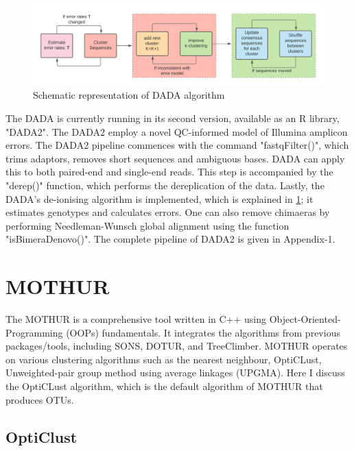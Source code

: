 \begin{figure}
  \centering
  \includegraphics[width=15cm]{../figures/Figure4.png}
  \caption{Schematic representation of DADA algorithm}
  \label{fig:figure4}
\end{figure}

The DADA is currently running in its second version, available as an R library, "DADA2". The DADA2 employ a novel QC-informed model of Illumina amplicon errors. The DADA2 pipeline commences with the command "fastqFilter()", which trims adaptors, removes short sequences and ambiguous bases. DADA can apply this to both paired-end and single-end reads. This step is accompanied by the "derep()" function, which performs the dereplication of the data. Lastly, the DADA's de-ionising algorithm is implemented, which is explained in  \ref{fig:figure4}; it estimates genotypes and calculates errors. One can also remove chimaeras by performing Needleman-Wunsch global alignment using the function "isBimeraDenovo()". The complete pipeline of DADA2 is given in Appendix-1.

\section{MOTHUR}
The MOTHUR is a comprehensive tool written in C++ using Object-Oriented-Programming (OOPs) fundamentals. It integrates the algorithms from previous packages/tools, including SONS, DOTUR, and TreeClimber. MOTHUR operates on various clustering algorithms such as the nearest neighbour, OptiCLust, Unweighted-pair group method using average linkages (UPGMA). Here I discuss the OptiCLust algorithm, which is the default algorithm of MOTHUR that produces OTUs.

\subsection{OptiClust}

